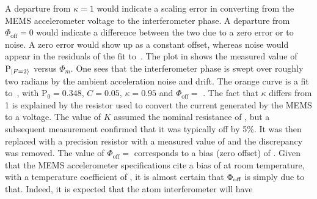A departure from $\kappa = 1$ would indicate a scaling error in
converting from the MEMS accelerometer voltage to the interferometer
phase. A departure from $\Phi_\text{off} = 0$ would indicate a
difference between the two due to a zero error or to noise. A zero
error would show up as a constant offset, whereas noise would appear in
the residuals of the fit to~.
The plot in  shows the measured value of
$\text{P}_{\ket{F=2}}$ versus $\Phi_m$. One sees that the
interferometer phase is swept over roughly two radians by the ambient
acceleration noise and drift. The orange curve is a fit
to~, with $\text{P}_0 = 0.348$,
$C = 0.05$, $\kappa = 0.95$ and $\Phi_\text{off} =$
. The fact that $\kappa$ differs from 1 is
explained by the resistor used to convert the current generated by the
MEMS to a voltage. The value of $K$ assumed the nominal resistance of
, but a subsequent
measurement confirmed that it was typically off by 5\%. It was then replaced with
a  precision resistor with a measured value of
 and the discrepancy was removed. The value of $\Phi_\text{off} =
$ corresponds to a bias (zero offset) of
. Given that the MEMS
accelerometer specifications cite a bias of
 at room temperature, with a temperature
coefficient of ,
it is almost certain that $\Phi_\textnormal{off}$ is simply due to
that. Indeed, it is expected that the atom interferometer will have
